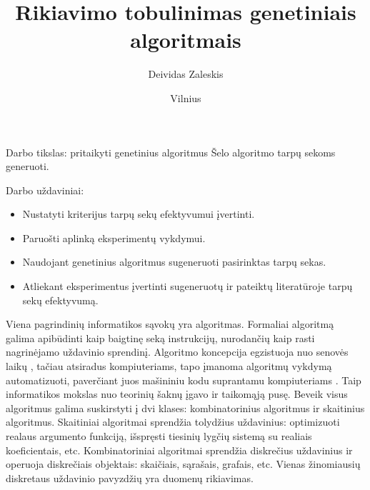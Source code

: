 \documentclass{VUMIFInfKursinis}
\institute{Informatikos institutas}  %
\title{Rikiavimo tobulinimas genetiniais algoritmais}
\author{Deividas Zaleskis}
\date{Vilnius \\ \the\year}
\begin{document}
\maketitle

\tableofcontents



Darbo tikslas:
pritaikyti genetinius algoritmus Šelo algoritmo tarpų sekoms generuoti.

\bigskip

Darbo uždaviniai:

\begin{itemize}
  \item Nustatyti kriterijus tarpų sekų efektyvumui įvertinti.
  \item Paruošti aplinką eksperimentų vykdymui.
  \item Naudojant genetinius algoritmus sugeneruoti pasirinktas tarpų sekas.
  \item Atliekant eksperimentus įvertinti sugeneruotų ir pateiktų literatūroje tarpų sekų efektyvumą.
\end{itemize}

Viena pagrindinių informatikos sąvokų yra algoritmas.
Formaliai algoritmą galima apibūdinti kaip
baigtinę seką instrukcijų, nurodančių kaip rasti nagrinėjamo uždavinio sprendinį.
Algoritmo koncepcija egzistuoja nuo senovės laikų \cite{knuth1972ancient}, tačiau atsiradus kompiuteriams,
tapo įmanoma algoritmų vykdymą automatizuoti, paverčiant juos mašininiu kodu suprantamu kompiuteriams \cite{wilkes1951preparation}.
Taip informatikos mokslas nuo teorinių šaknų \cite{turing1937computable} įgavo ir taikomąją pusę.
Beveik visus algoritmus galima suskirstyti į dvi klases: kombinatorinius algoritmus ir skaitinius algoritmus.
Skaitiniai algoritmai sprendžia tolydžius uždavinius: optimizuoti realaus argumento funkciją, išspręsti tiesinių lygčių sistemą su realiais koeficientais, etc.
Kombinatoriniai algoritmai sprendžia diskrečius uždavinius ir operuoja diskrečiais objektais: skaičiais, sąrašais, grafais, etc.
Vienas žinomiausių diskretaus uždavinio pavyzdžių yra duomenų rikiavimas.
\end{document}
